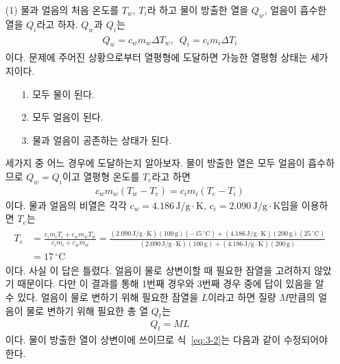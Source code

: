 \documentclass[floatfix,nofootinbib,superscriptaddress,fleqn]{revtex4-2}
\begin{document}
\begin{itemize}
  \item[(1)]
  물과 얼음의 처음 온도를 $T_w$, $T_i$라 하고
물이 방출한 열을 $Q_{w}$, 얼음이 흡수한 열을 $Q_{i}$라고 하자.
$Q_{w}$과 $Q_{i}$는
\begin{align}
  \begin{split}
    Q_{w}  = c_{w}m_{w}\Delta T_w ,\,\,\,Q_{i} = c_{i}m_{i}\Delta T_i
  \end{split}
\end{align}
이다. 문제에 주어진 상황으로부터 열평형에 도달하면 가능한 열평형 상태는 세가지이다.
\begin{itemize}
  \item[1.] 모두 물이 된다.
  \item[2.] 모두 얼음이 된다.
  \item[3.] 물과 얼음이 공존하는 상태가 된다.  
\end{itemize}
세가지 중 어느 경우에 도달하는지 알아보자. 물이 방출한 열은 모두 얼음이 흡수하므로
$Q_{w}  =  Q_{i}$이고 열평형 온도를 $T_e$라고 하면
\begin{align}\label{eq:3-2}
  c_{w}m_{w}(T_w-T_e) = c_{i}m_{i}(T_e-T_i)
\end{align}
이다. 물과 얼음의 비열은 각각 $c_{w}=4.186\,\mathrm{J/g\cdot K}$,
$c_{i}=2.090\,\mathrm{J/g\cdot K}$임을 이용하면 $T_e$는
\begin{align}
  \begin{split}
    T_e &= \frac{c_i m_i T_i+c_w m_w T_w}{c_i m_i+c_w m_w}
    = \frac{(2.090\,\mathrm{J/g\cdot K}) (100\,\mathrm{g}) (-15\,\mathrm{^\circ C})
    +(4.186\,\mathrm{J/g\cdot K}) (200\,\mathrm{g}) (25\,\mathrm{^\circ C})}
    {(2.090\,\mathrm{J/g\cdot K}) (100\,\mathrm{g})
    +(4.186\,\mathrm{J/g\cdot K}) (200\,\mathrm{g})}  \\
    &= 17\,\mathrm{^\circ C}
  \end{split}
\end{align}
이다. 사실 이 답은 틀렸다. 얼음이 물로 상변이할 때 필요한 잠열을 고려하지 않았기 때문이다.
다만 이 결과를 통해 1번째 경우와 3번째 경우 중에 답이 있음을 알 수 있다. 
얼음이 물로 변하기 위해 필요한 잠열을 $L$이라고 하면 질량 $M$만큼의 얼음이 물로 변하기 위해
필요한 총 열 $Q_t$는
\begin{align}
Q_t = ML
\end{align}
이다. 물이 방출한 열이 상변이에 쓰이므로 식~\eqref{eq:3-2}는 다음과 같이 수정되어야한다.
\begin{align}

\end{align}
\end{itemize}
\end{document}
